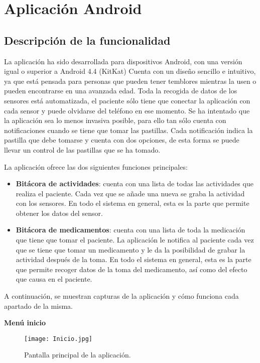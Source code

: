 \section{Aplicación Android}
\subsection{Descripción de la funcionalidad}
La aplicación ha sido desarrollada para dispositivos Android, con una versión igual o superior a Android 4.4 (KitKat) Cuenta con un diseño sencillo e intuitivo, ya que está pensada para personas que pueden tener temblores mientras la usen o pueden encontrarse en una avanzada edad. Toda la recogida de datos de los sensores está automatizada, el paciente sólo tiene que conectar la aplicación con cada sensor y puede olvidarse del teléfono en ese momento. Se ha intentado que la aplicación sea lo menos invasiva posible, para ello tan sólo cuenta con notificaciones cuando se tiene que tomar las pastillas. Cada notificación indica la pastilla que debe tomarse y cuenta con dos opciones, de esta forma se puede llevar un control de las pastillas que se ha tomado.
\newline

La aplicación ofrece las dos siguientes funciones principales:

\begin{itemize}
	\item {\bf Bitácora de actividades}: cuenta con una lista de todas las actividades que realiza el paciente. Cada vez que se añade una nueva se graba la actividad con los sensores. En todo el sistema en general, esta es la parte que permite obtener los datos del sensor.
    \item {\bf Bitácora de medicamentos}: cuenta con una lista de toda la medicación que tiene que tomar el paciente. La aplicación le notifica al paciente cada vez que se tiene que tomar un medicamento y le da la posibilidad de grabar la actividad después de la toma. En todo el sistema en general, esta es la parte que permite recoger datos de la toma del medicamento, así como del efecto que causa en el paciente.
\end{itemize}

A continuación, se muestran capturas de la aplicación y cómo funciona cada apartado de la misma.
\newline

{\bf Menú inicio}
\begin{figure}[h!]
\centering
\texttt{[image: Inicio.jpg]}
\caption{Pantalla principal de la aplicación.}
\end{figure}
\newpage

